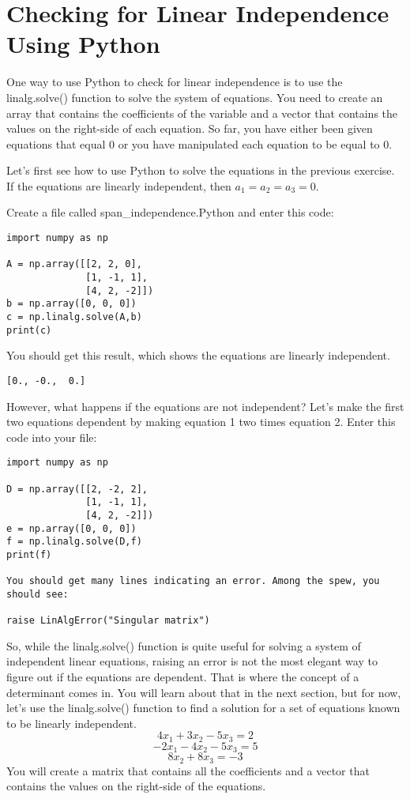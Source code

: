 \section{Checking for Linear Independence Using Python}  
One way to use Python to check for linear independence is to use the 
linalg.solve() function to solve the system of equations. You need to create 
an array that contains the coefficients of the variable and a vector that 
contains the values on the right-side of each equation. So far, you have either 
been given equations that equal 0 or you have manipulated each equation to be 
equal to 0. 

Let's first see how to use Python to solve the equations in the previous 
exercise. If the equations are linearly independent, then $a_1 = a_2 = a_3 = 0$.

Create a file called span\_independence.Python and enter this code:
\begin{Verbatim}
import numpy as np

A = np.array([[2, 2, 0], 
              [1, -1, 1],
              [4, 2, -2]])
b = np.array([0, 0, 0])
c = np.linalg.solve(A,b)
print(c)
\end{Verbatim}
You should get this result, which shows the equations are linearly independent.
\begin{Verbatim}
[0., -0.,  0.]
\end{Verbatim}
However, what happens if the equations are not independent? Let's make the 
first two equations dependent by making equation 1 two times equation 2. Enter 
this code into your file:
\begin{Verbatim}
import numpy as np

D = np.array([[2, -2, 2], 
              [1, -1, 1],
              [4, 2, -2]])
e = np.array([0, 0, 0])
f = np.linalg.solve(D,f)
print(f)

You should get many lines indicating an error. Among the spew, you should see:

raise LinAlgError("Singular matrix")
\end{Verbatim}
So, while the linalg.solve() function is quite useful for solving a system of 
independent linear equations, raising an error is not the most elegant way to 
figure out if the equations are dependent. That is where the concept of a 
determinant comes in. You will learn about that in the next section, but for 
now, let's use the  linalg.solve() function to find a solution for a set of 
equations known to be linearly independent.
$$4x_1 + 3x_2 - 5x_3 = 2$$
$$-2x_1- 4x_2 - 5x_3 = 5$$
$$       8x_2 + 8x_3  = -3$$
You will create a matrix that contains all the coefficients and a vector that 
contains the values on the right-side of the equations. 

